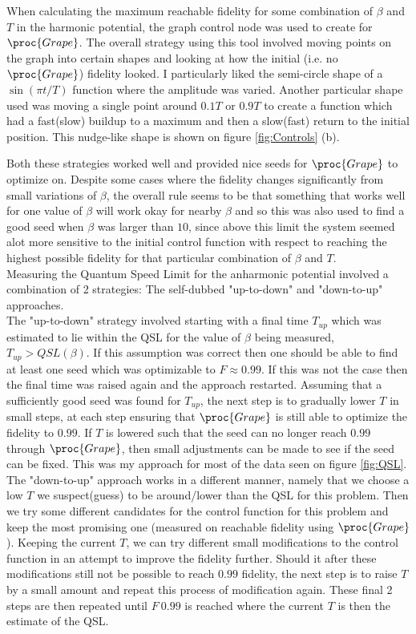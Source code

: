 \documentclass[aps,pra,reprint,superscriptaddress]{revtex4-1}
\begin{document}
When calculating the maximum reachable fidelity for some combination of $\beta$ and $T$ in the harmonic potential, the graph control node was used to create for $\proc{Grape}$. The overall strategy using this tool involved moving points on the graph into certain shapes and looking at how the initial (i.e. no $\proc{Grape}$) fidelity looked. I particularly liked the semi-circle shape of a $\sin(\pi t/T)$ function where the amplitude was varied. Another particular shape used was moving a single point around $0.1T$ or $0.9T$ to create a function which had a fast(slow) buildup to a maximum and then a slow(fast) return to the initial position. This nudge-like shape is shown on figure \ref{fig:Controls} (b).

Both these strategies worked well and provided nice seeds for $\proc{Grape}$ to optimize on. Despite some cases where the fidelity changes significantly from small variations of $\beta$, the overall rule seems to be that something that works well for one value of $\beta$ will work okay for nearby $\beta$ and so this was also used to find a good seed when $\beta$ was larger than $10$, since above this limit the system seemed alot more sensitive to the initial control function with respect to reaching the highest possible fidelity for that particular combination of $\beta$ and $T$. \\

Measuring the Quantum Speed Limit for the anharmonic potential involved a combination of 2 strategies: The self-dubbed "up-to-down" and "down-to-up" approaches. \\

The "up-to-down" strategy involved starting with a final time $T_{up}$ which was estimated to lie within the QSL for the value of $\beta$ being measured, $T_{up} > QSL(\beta)$. If this assumption was correct then one should be able to find at least one seed which was optimizable to $F\approx 0.99$. If this was not the case then the final time was raised again and the approach restarted. Assuming that a sufficiently good seed was found for $T_{up}$, the next step is to gradually lower $T$ in small steps, at each step ensuring that $\proc{Grape}$ is still able to optimize the fidelity to $0.99$. If $T$ is lowered such that the seed can no longer reach $0.99$ through $\proc{Grape}$, then small adjustments can be made to see if the seed can be fixed. This was my approach for most of the data seen on figure \ref{fig:QSL}.\\

The "down-to-up" approach works in a different manner, namely that we choose a low $T$ we suspect(guess) to be around/lower than the QSL for this problem. Then we try some different candidates for the control function for this problem and keep the most promising one (measured on reachable fidelity using $\proc{Grape}$). Keeping the current $T$, we can try different small modifications to the control function in an attempt to improve the fidelity further. Should it after these modifications still not be possible to reach $0.99$ fidelity, the next step is to raise $T$ by a small amount and repeat this process of modification again. These final 2 steps are then repeated until $F~0.99$ is reached where the current $T$ is then the estimate of the QSL. 
\end{document}
